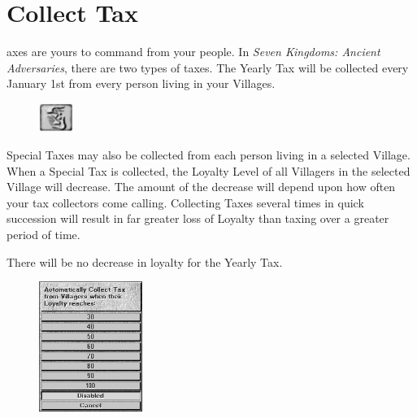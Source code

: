 \section{\textsf{Collect Tax}}


axes are yours to command from your people. In \textit{Seven Kingdoms: Ancient Adversaries}, there are two types of taxes. The Yearly Tax will be collected every January 1st from every person living in your Villages.

\begin{figure}
    \vspace{-20pt}
    \begin{center}
        \includegraphics[width=0.1\textwidth]{Ttax}
    \end{center}
    \vspace{-20pt}
\end{figure}

Special Taxes may also be collected from each person living in a selected Village. When a Special Tax is collected, the Loyalty Level of all Villagers in the selected Village will decrease. The amount of the decrease will depend upon how often your tax collectors come calling. Collecting Taxes several times in quick succession will result in far greater loss of Loyalty than taxing over a greater period of time.

There will be no decrease in loyalty for the Yearly Tax.


\begin{figure}
    \vspace{-20pt}
    \begin{center}
        \includegraphics[width=0.3\textwidth]{Iautotax} %
    \end{center}
    \vspace{-20pt}
\end{figure}

